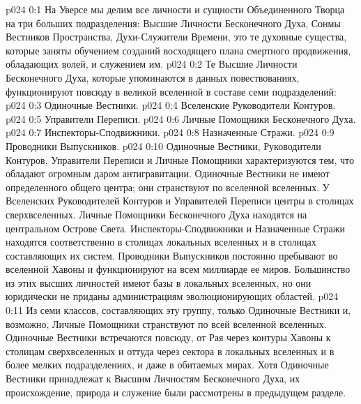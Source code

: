 \author{Божественный Советник}
\vs p024 0:1 На Уверсе мы делим все личности и сущности Объединенного Творца на три больших подразделения: Высшие Личности Бесконечного Духа, Сонмы Вестников Пространства, Духи\hyp{}Служители Времени, это те духовные существа, которые заняты обучением созданий восходящего плана смертного продвижения, обладающих волей, и служением им.
\vs p024 0:2 \pc Те Высшие Личности Бесконечного Духа, которые упоминаются в данных повествованиях, функционируют повсюду в великой вселенной в составе семи подразделений:
\vs p024 0:3 \bibnobreakspace Одиночные Вестники.
\vs p024 0:4 \bibnobreakspace Вселенские Руководители Контуров.
\vs p024 0:5 \bibnobreakspace Управители Переписи.
\vs p024 0:6 \bibnobreakspace Личные Помощники Бесконечного Духа.
\vs p024 0:7 \bibnobreakspace Инспекторы\hyp{}Сподвижники.
\vs p024 0:8 \bibnobreakspace Назначенные Стражи.
\vs p024 0:9 \bibnobreakspace Проводники Выпускников.
\vs p024 0:10 \pc Одиночные Вестники, Руководители Контуров, Управители Переписи и Личные Помощники характеризуются тем, что обладают огромным даром антигравитации. Одиночные Вестники не имеют определенного общего центра; они странствуют по вселенной вселенных. У Вселенских Руководителей Контуров и Управителей Переписи центры в столицах сверхвселенных. Личные Помощники Бесконечного Духа находятся на центральном Острове Света. Инспекторы\hyp{}Сподвижники и Назначенные Стражи находятся соответственно в столицах локальных вселенных и в столицах составляющих их систем. Проводники Выпускников постоянно пребывают во вселенной Хавоны и функционируют на всем миллиарде ее миров. Большинство из этих высших личностей имеют базы в локальных вселенных, но они юридически не приданы администрациям эволюционирующих областей.
\vs p024 0:11 Из семи классов, составляющих эту группу, только Одиночные Вестники и, возможно, Личные Помощники странствуют по всей вселенной вселенных. Одиночные Вестники встречаются повсюду, от Рая через контуры Хавоны к столицам сверхвселенных и оттуда через сектора в локальных вселенных и в более мелких подразделениях, и даже в обитаемых мирах. Хотя Одиночные Вестники принадлежат к Высшим Личностям Бесконечного Духа, их происхождение, природа и служение были рассмотрены в предыдущем разделе.
